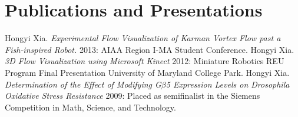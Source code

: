 \documentclass[10pt,a4paper,sans]{moderncv}        %
\begin{document}

\renewcommand{\refname}{Presentations}
\section{Publications and Presentations}
% 
\begin{thebibliography}{1}
 Hongyi Xia. {\em Experimental Flow Visualization of Karman Vortex Flow past a Fish-inspired Robot.}  2013: AIAA Region I-MA Student Conference.
  Hongyi Xia. {\em 3D Flow Visualization using Microsoft Kinect} 2012:
Miniature Robotics REU Program Final Presentation University of Maryland College Park.
 Hongyi Xia. {\em Determination of the Effect of Modifying G$\beta$5 Expression Levels on Drosophila Oxidative Stress Resistance} 2009: Placed as semifinalist in the Siemens Competition in Math, Science, and Technology.
\end{thebibliography}



\end{document}
